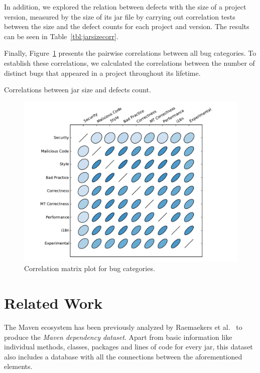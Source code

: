 \documentclass{sig-alternate}
\begin{document}
In addition, we explored the relation between defects with the size of a project
version, measured by the size of its {\sc jar} file by carrying out
correlation tests between the size and the defect counts for each
project and version. The results can be seen in
Table~\ref{tbl:jarsizecorr}.

Finally, Figure~\ref{fig:corrplot} presents the pairwise correlations
between all bug categories. To establish these correlations,
we calculated the
correlations between the number of distinct bugs that appeared in
a project throughout its lifetime.

\begin{table}[hbt]
    \centering
    \caption{Correlations between {\sc jar} size and defects count.}
    \label{tbl:jarsizecorr}
    
\end{table}


\begin{figure}
  \centering
  \includegraphics[scale=0.43]{corrplot.pdf}
  \caption{Correlation matrix plot for bug categories.}
  \label{fig:corrplot}
\end{figure}

\section{Related Work}
\label{sec:rel}

The Maven ecosystem has been previously analyzed by
Raemaekers et al.~\cite{RDV13}
to produce the {\it Maven dependency dataset}.
Apart from basic information like individual methods, classes,
packages and lines of code for every {\sc jar}, this dataset
also includes a database with all the
connections between the aforementioned elements.
\end{document}
